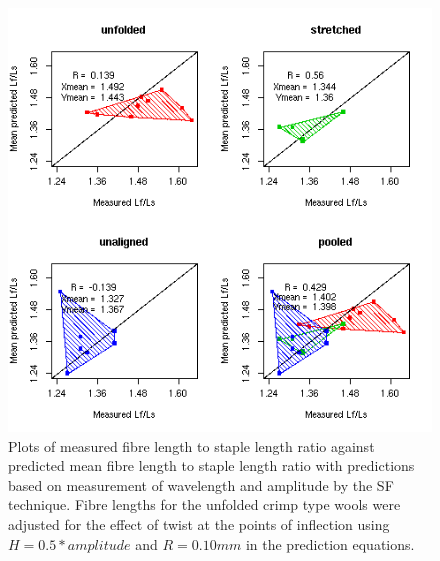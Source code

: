 %

\begin{figure}[!h]
  \centering
  \includegraphics[width=1.1\textwidth]{figsfpredlfr.png}
  \caption{Plots of measured fibre length to staple length ratio against predicted mean fibre length to staple length ratio with predictions based on measurement of wavelength and amplitude by the SF technique. Fibre lengths for the unfolded crimp type wools were adjusted for the effect of twist at the points of inflection using $H = 0.5 * amplitude$ and $R = 0.10 mm$ in the prediction equations.}
  \label{fig:sfpredlfr}
\end{figure}

%

